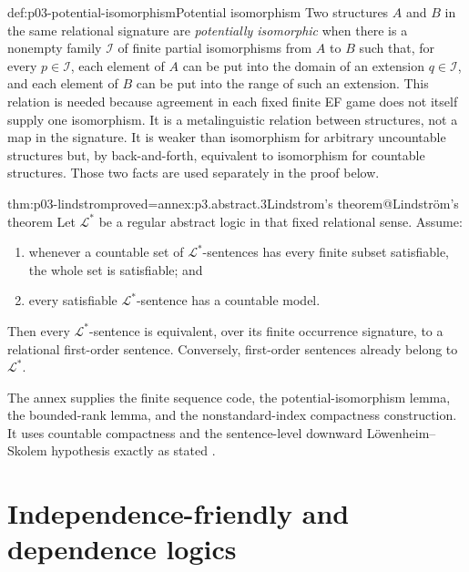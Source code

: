 \begin{hbdefinition}{def:p03-potential-isomorphism}{Potential isomorphism}
Two structures \(A\) and \(B\) in the same relational signature are
\emph{potentially isomorphic} when there is a nonempty family \(\mathcal I\)
of finite partial isomorphisms from \(A\) to \(B\) such that, for every
\(p\in\mathcal I\), each element of \(A\) can be put into the domain of an
extension \(q\in\mathcal I\), and each element of \(B\) can be put into the
range of such an extension.  This relation is needed because agreement in
each fixed finite EF game does not itself supply one isomorphism.  It is a
metalinguistic relation between structures, not a map in the signature.  It
is weaker than isomorphism for arbitrary uncountable structures but, by
back-and-forth, equivalent to isomorphism for countable structures.  Those two
facts are used separately in the proof below.
\end{hbdefinition}

\begin{hbtheorem}{thm:p03-lindstrom}{proved=annex:p3.abstract.3}{Lindstrom's theorem@Lindstr\"om's theorem}
Let \(\mathcal L^{\ast}\) be a regular abstract logic in that fixed relational
sense.  Assume:
\begin{enumerate}
 \item whenever a countable set of \(\mathcal L^{\ast}\)-sentences has every
       finite subset satisfiable, the whole set is satisfiable; and
 \item every satisfiable \(\mathcal L^{\ast}\)-sentence has a countable model.
\end{enumerate}
Then every \(\mathcal L^{\ast}\)-sentence is equivalent, over its finite
occurrence signature, to a relational first-order sentence.  Conversely,
first-order sentences already belong to \(\mathcal L^{\ast}\).
\end{hbtheorem}

The annex supplies the finite sequence code, the potential-isomorphism lemma,
the bounded-rank lemma, and the nonstandard-index compactness construction.
It uses countable compactness and the sentence-level downward
L\"owenheim--Skolem hypothesis exactly as stated
\cite{Lindstrom1969,EbbinghausFlumThomas1994}.



\section{Independence-friendly and dependence logics}
\label{sec:p03-dependence-logics}

